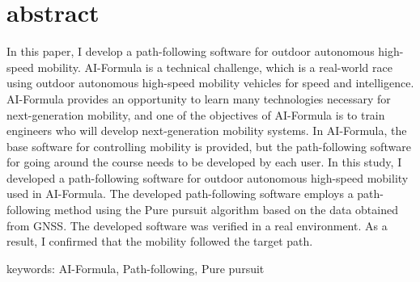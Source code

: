\chapter*{abstract}
\thispagestyle{empty}
%
\begin{center}
  \centering
  \scalebox{1.3}{Development of path-following software for}
  \scalebox{1.3}{outdoor autonomous high-speed mobility}
\end{center}
\vspace{1.0zh}
%
  In this paper, I develop a path-following software for outdoor autonomous high-speed mobility.
AI-Formula is a technical challenge, which is a real-world race using outdoor autonomous high-speed mobility vehicles for speed and intelligence.
AI-Formula provides an opportunity to learn many technologies necessary for next-generation mobility, and one of the objectives of AI-Formula is to train engineers who will develop next-generation mobility systems.
% 
In AI-Formula, the base software for controlling mobility is provided, but the path-following software for going around the course needs to be developed by each user.
In this study, I developed a path-following software for outdoor autonomous high-speed mobility used in AI-Formula.
% 
The developed path-following software employs a path-following method using the Pure pursuit algorithm based on the data obtained from GNSS.
The developed software was verified in a real environment.
% 
As a result, I confirmed that the mobility followed the target path.
%
\vspace{2.0zh}

keywords: AI-Formula, Path-following, Pure pursuit
